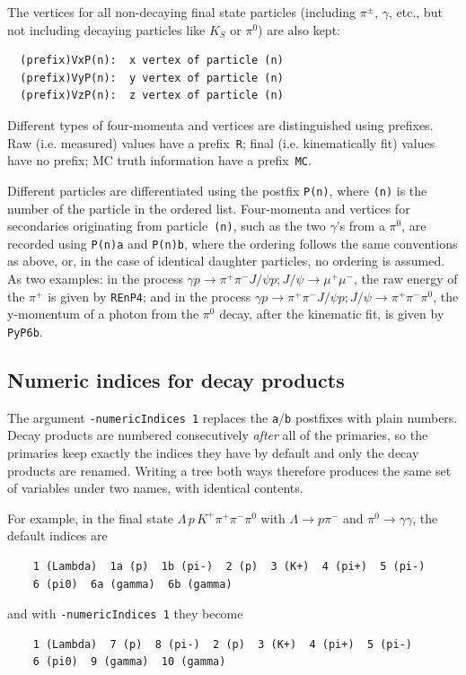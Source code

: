 \documentclass[11pt]{article}
\begin{document}
The vertices for all non-decaying final state particles (including $\pi^\pm$, $\gamma$, etc., but not including decaying particles like $K_S$ or $\pi^0$) are also kept:

\begin{verbatim}
  (prefix)VxP(n):  x vertex of particle (n)
  (prefix)VyP(n):  y vertex of particle (n)
  (prefix)VzP(n):  z vertex of particle (n)
\end{verbatim}

Different types of four-momenta and vertices are distinguished using prefixes.  Raw (i.e. measured) values have a prefix~{\tt R}; final (i.e. kinematically fit) values have no prefix; MC truth information have a prefix~{\tt MC}.

Different particles are differentiated using the postfix {\tt P(n)}, where {\tt (n)} is the number of the particle in the ordered list.  Four-momenta and vertices for secondaries originating from particle~{\tt (n)}, such as the two $\gamma$'s from a $\pi^0$, are recorded using {\tt P(n)a} and {\tt P(n)b}, where the ordering follows the same conventions as above, or, in the case of identical daughter particles, no ordering is assumed.  As two examples: in the process $\gamma p \to\pi^+\pi^-J/\psi p; J/\psi\to\mu^+\mu^-$, the raw energy of the $\pi^+$ is given by {\tt REnP4}; and in the process $\gamma p \to \pi^+\pi^-J/\psi p; J/\psi\to\pi^+\pi^-\pi^0$, the y-momentum of a photon from the $\pi^0$ decay, after the kinematic fit, is given by {\tt PyP6b}.

\subsection{Numeric indices for decay products}
\label{sec:nt:numericindices}

The argument {\tt -numericIndices 1} replaces the {\tt a}/{\tt b} postfixes with plain numbers.  Decay products are numbered consecutively \emph{after} all of the primaries, so the primaries keep exactly the indices they have by default and only the decay products are renamed.  Writing a tree both ways therefore produces the same set of variables under two names, with identical contents.

For example, in the final state $\Lambda\,p\,K^+\pi^+\pi^-\pi^0$ with $\Lambda\to p\pi^-$ and $\pi^0\to\gamma\gamma$, the default indices are
\begin{verbatim}
    1 (Lambda)  1a (p)  1b (pi-)  2 (p)  3 (K+)  4 (pi+)  5 (pi-)
    6 (pi0)  6a (gamma)  6b (gamma)
\end{verbatim}
and with {\tt -numericIndices 1} they become
\begin{verbatim}
    1 (Lambda)  7 (p)  8 (pi-)  2 (p)  3 (K+)  4 (pi+)  5 (pi-)
    6 (pi0)  9 (gamma)  10 (gamma)
\end{verbatim}
\end{document}
